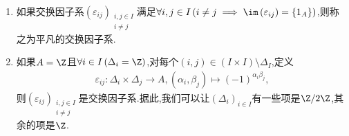 \begin{example}{}{}
	\begin{enumerate}
		\item 如果交换因子系$\left(\varepsilon_{ij}\right)_{\substack{i,j\in I\\i\neq j}}$满足$\forall i,j\in I\left(i\neq j\implies\im\left(\varepsilon_{ij}\right)=\left\{1_{A}\right\}\right)$,则称之为平凡的交换因子系.
		\item 如果$A=\Z$且$\forall i\in I\left(\Delta_{i}=\Z\right)$,对每个$\left(i,j\right)\in\left(I\times I\right)\setminus\Delta_{I}$,定义
		\begin{align*}
			\varepsilon_{ij}:\Delta_{i}\times\Delta_{j}\to A,\left(\alpha_{i},\beta_{j}\right)\mapsto\left(-1\right)^{\alpha_{i}\beta_{j}},
		\end{align*}
		则$\left(\varepsilon_{ij}\right)_{\substack{i,j\in I\\i\neq j}}$是交换因子系.据此,我们可以让$\left(\Delta_{i}\right)_{i\in I}$有一些项是$\Z/2\Z$,其余的项是$\Z$.
	\end{enumerate}
\end{example}

